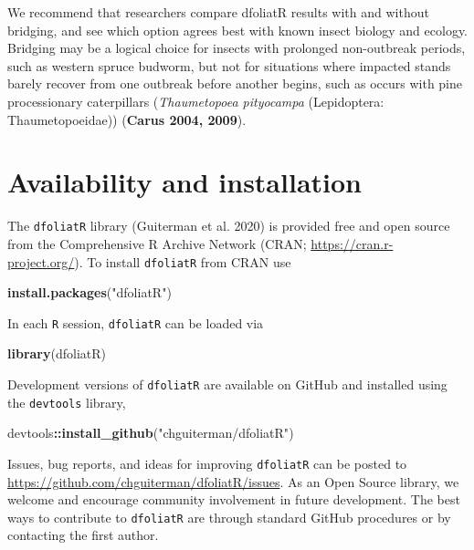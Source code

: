 \documentclass[review]{elsarticle} %
\newenvironment{Shaded}{\begin{snugshade}}{\end{snugshade}}
\newcommand{\KeywordTok}[1]{\textcolor[rgb]{0.13,0.29,0.53}{\textbf{#1}}}
\newcommand{\NormalTok}[1]{#1}
\newcommand{\OperatorTok}[1]{\textcolor[rgb]{0.81,0.36,0.00}{\textbf{#1}}}
\newcommand{\StringTok}[1]{\textcolor[rgb]{0.31,0.60,0.02}{#1}}
\begin{document}
We recommend that researchers compare dfoliatR results with and without
bridging, and see which option agrees best with known insect biology and
ecology. Bridging may be a logical choice for insects with prolonged
non-outbreak periods, such as western spruce budworm, but not for
situations where impacted stands barely recover from one outbreak before
another begins, such as occurs with pine processionary caterpillars
(\emph{Thaumetopoea pityocampa} (Lepidoptera: Thaumetopoeidae))
(\textbf{Carus 2004, 2009}).

\hypertarget{availability-and-installation}{%
\section{Availability and
installation}\label{availability-and-installation}}

The \texttt{dfoliatR} library (Guiterman et al. 2020) is provided free
and open source from the Comprehensive R Archive Network (CRAN;
\url{https://cran.r-project.org/}). To install \texttt{dfoliatR} from
CRAN use

\begin{Shaded}
\begin{Highlighting}[]
\KeywordTok{install.packages}\NormalTok{(}\StringTok{"dfoliatR"}\NormalTok{)}
\end{Highlighting}
\end{Shaded}

In each \texttt{R} session, \texttt{dfoliatR} can be loaded via

\begin{Shaded}
\begin{Highlighting}[]
\KeywordTok{library}\NormalTok{(dfoliatR)}
\end{Highlighting}
\end{Shaded}

Development versions of \texttt{dfoliatR} are available on GitHub and
installed using the \texttt{devtools} library,

\begin{Shaded}
\begin{Highlighting}[]
\NormalTok{devtools}\OperatorTok{::}\KeywordTok{install_github}\NormalTok{(}\StringTok{"chguiterman/dfoliatR"}\NormalTok{)}
\end{Highlighting}
\end{Shaded}

Issues, bug reports, and ideas for improving \texttt{dfoliatR} can be
posted to \url{https://github.com/chguiterman/dfoliatR/issues}. As an
Open Source library, we welcome and encourage community involvement in
future development. The best ways to contribute to \texttt{dfoliatR} are
through standard GitHub procedures or by contacting the first author.
\end{document}

